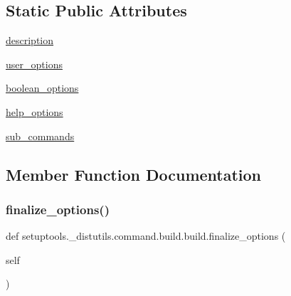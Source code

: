 \subsection*{Static Public Attributes}
\begin{DoxyCompactItemize}
\item 
\hyperlink{classsetuptools_1_1__distutils_1_1command_1_1build_1_1build_a9476a8c335eca3a0be55ea4890f1a725}{description}
\item 
\hyperlink{classsetuptools_1_1__distutils_1_1command_1_1build_1_1build_a09ca7d18bc03e80f93870d2e6b47a5d3}{user\+\_\+options}
\item 
\hyperlink{classsetuptools_1_1__distutils_1_1command_1_1build_1_1build_aab05ae245922a3ecb713b064e8b90039}{boolean\+\_\+options}
\item 
\hyperlink{classsetuptools_1_1__distutils_1_1command_1_1build_1_1build_ac963b181493e2c1bccabf413040ff16a}{help\+\_\+options}
\item 
\hyperlink{classsetuptools_1_1__distutils_1_1command_1_1build_1_1build_a11ffc19dc2dfaabe24182c6782abe0da}{sub\+\_\+commands}
\end{DoxyCompactItemize}


\subsection{Member Function Documentation}
\mbox{\label{classsetuptools_1_1__distutils_1_1command_1_1build_1_1build_af3bf5ecebb84095776b02df5b4dcaa19}} 
\subsubsection{\texorpdfstring{finalize\+\_\+options()}{finalize\_options()}}
{\footnotesize\ttfamily def setuptools.\+\_\+distutils.\+command.\+build.\+build.\+finalize\+\_\+options (\begin{DoxyParamCaption}\item[{}]{self }\end{DoxyParamCaption})}

\mbox{\label{classsetuptools_1_1__distutils_1_1command_1_1build_1_1build_a680bdee77d9f3ee9c516fabdb04c000b}} 
